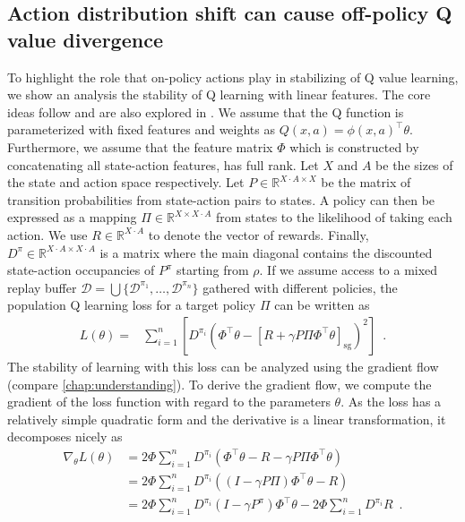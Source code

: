 \subsection{Action distribution shift can cause off-policy Q value divergence}
\label{sec:mad:theory}
To highlight the role that on-policy actions play in stabilizing of Q value learning, we show an analysis the stability of Q learning with linear features.
The core ideas follow \textcite{sutton2016emphatic} and are also explored in \textcite{tsitsiklis1996analysis,sutton1988learning}.
We assume that the Q function is parameterized with fixed features and weights as $Q(x,a) = \phi(x,a)^\top \theta$.
Furthermore, we assume that the feature matrix $\Phi$ which is constructed by concatenating all state-action features, has full rank.
Let $X$ and $A$ be the sizes of the state and action space respectively. Let $P \in \mathbb{R}^{X\cdot A \times X}$ be the matrix of transition probabilities from state-action pairs to states.
A policy can then be expressed as a mapping $\Pi \in \mathbb{R}^{X\times X\cdot A}$ from states to the likelihood of taking each action.
We use $R \in \mathbb{R}^{X\cdot A}$ to denote the vector of rewards.
Finally, $D^{\pi} \in \mathbb{R}^{X\cdot A \times X\cdot A}$ is a matrix where the main diagonal contains the discounted state-action occupancies of $P^\pi$ starting from $\rho$.
If we assume access to a mixed replay buffer $\mathcal{D} = \bigcup \{\mathcal{D}^{\pi_1}, \dots, \mathcal{D}^{\pi_n}\}$ gathered with different policies, the population Q learning loss for a target policy $\Pi$ can be written as
\begin{align}
    L(\theta) = & \sum_{i=1}^n \left[D^{\pi_i}\left(\Phi^\top \theta - [R + \gamma P\Pi \Phi^\top \theta]_\mathrm{sg}\right)^2\right] \enspace.
\end{align}
The stability of learning with this loss can be analyzed using the gradient flow (compare \autoref{chap:understanding}).
To derive the gradient flow, we compute the gradient of the loss function with regard to the parameters $\theta$.
As the loss has a relatively simple quadratic form and the derivative is a linear transformation, it decomposes nicely as
\begin{align}
    \nabla_\theta L(\theta) &= 2 \Phi \sum_{i=1}^n D^{\pi_i} \left(\Phi^\top \theta - R - \gamma P \Pi \Phi^\top \theta\right)\\
    &= 2 \Phi \sum_{i=1}^n D^{\pi_i} \left(\left(I - \gamma P \Pi \right)\Phi^\top \theta - R\right)\\
    &= 2 \Phi \sum_{i=1}^n D^{\pi_i} \left(I - \gamma P^\pi \right)\Phi^\top \theta - 2 \Phi \sum_{i=1}^n D^{\pi_i} R\enspace.
\end{align}


